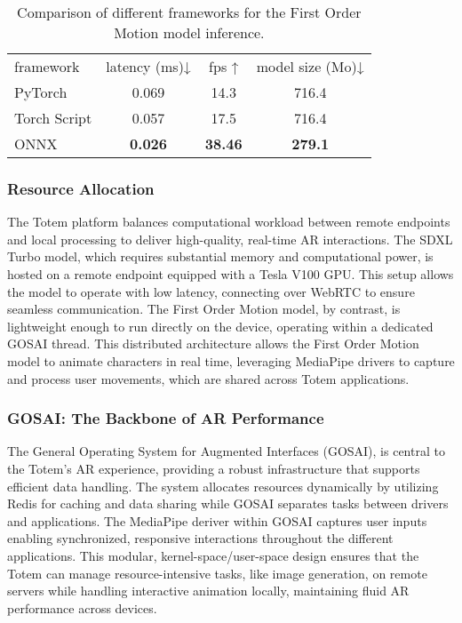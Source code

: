 \begin{table}[!h]
\footnotesize%
\begin{center}
    \begin{tabular}{lccc}
    \toprule
    framework    & latency (ms)↓ & fps ↑  & model size (Mo)↓ \\
    PyTorch      & 0.069        & 14.3  & 716.4           \\
    Torch Script & 0.057        & 17.5  & 716.4           \\
    ONNX         & \textbf{0.026}& \textbf{38.46} & \textbf{279.1}           \\
    \bottomrule
    \end{tabular}
\end{center}
\caption{Comparison of different frameworks for the First Order Motion model inference.}
\label{tab:frameworks}
\end{table}

\subsubsection{Resource Allocation}
The Totem platform balances computational workload between remote endpoints and local processing to deliver high-quality, real-time AR interactions.
The SDXL Turbo model, which requires substantial memory and computational power, is hosted on a remote endpoint equipped with a Tesla V100 GPU.
This setup allows the model to operate with low latency, connecting over WebRTC to ensure seamless communication.
The First Order Motion model, by contrast, is lightweight enough to run directly on the device, operating within a dedicated GOSAI thread.
This distributed architecture allows the First Order Motion model to animate characters in real time, leveraging MediaPipe drivers to capture and process user movements, which are shared across Totem applications.

\subsubsection{GOSAI: The Backbone of AR Performance}
The General Operating System for Augmented Interfaces (GOSAI), is central to the Totem’s AR experience, providing a robust infrastructure that supports efficient data handling.%
The system allocates resources dynamically by utilizing Redis for caching and data sharing while GOSAI separates tasks between drivers and applications.
The MediaPipe deriver within GOSAI captures user inputs enabling synchronized, responsive interactions throughout the different applications.
This modular, kernel-space/user-space design ensures that the Totem can manage resource-intensive tasks, like image generation, on remote servers while handling interactive animation locally, maintaining fluid AR performance across devices.

